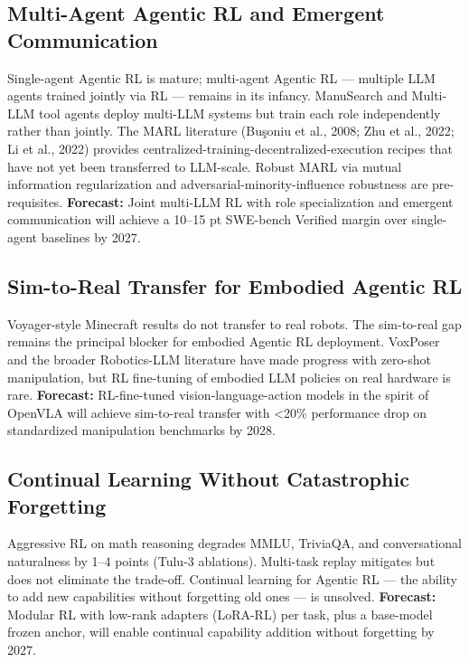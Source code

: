 \documentclass{article}
\begin{document}
\subsection{Multi-Agent Agentic RL and Emergent Communication}\label{multi-agent-agentic-rl-and-emergent-communication}

Single-agent Agentic RL is mature; multi-agent Agentic RL --- multiple LLM agents trained jointly via RL --- remains in its infancy. ManuSearch \citep{huang20252025} and Multi-LLM tool agents \citep{shen20242024} deploy multi-LLM systems but train each role independently rather than jointly. The MARL literature (Buşoniu et al., 2008; Zhu et al., 2022; Li et al., 2022) provides centralized-training-decentralized-execution recipes that have not yet been transferred to LLM-scale. Robust MARL via mutual information regularization \citep{li2025aplanreusemechanis} and adversarial-minority-influence robustness \citep{li2025aplanreusemechanis} are pre-requisites. \textbf{Forecast:} Joint multi-LLM RL with role specialization and emergent communication will achieve a 10--15 pt SWE-bench Verified margin over single-agent baselines by 2027.

\subsection{Sim-to-Real Transfer for Embodied Agentic RL}\label{sim-to-real-transfer-for-embodied-agentic-rl}

Voyager-style Minecraft results do not transfer to real robots. The sim-to-real gap remains the principal blocker for embodied Agentic RL deployment. VoxPoser \citep{huang20232023} and the broader Robotics-LLM literature have made progress with zero-shot manipulation, but RL fine-tuning of embodied LLM policies on real hardware is rare. \textbf{Forecast:} RL-fine-tuned vision-language-action models in the spirit of OpenVLA will achieve sim-to-real transfer with \textless20\% performance drop on standardized manipulation benchmarks by 2028.

\subsection{Continual Learning Without Catastrophic Forgetting}\label{continual-learning-without-catastrophic-forgetting}

Aggressive RL on math reasoning degrades MMLU, TriviaQA, and conversational naturalness by 1--4 points (Tulu-3 ablations). Multi-task replay mitigates but does not eliminate the trade-off. Continual learning for Agentic RL --- the ability to add new capabilities without forgetting old ones --- is unsolved. \textbf{Forecast:} Modular RL with low-rank adapters (LoRA-RL) per task, plus a base-model frozen anchor, will enable continual capability addition without forgetting by 2027.
\end{document}
